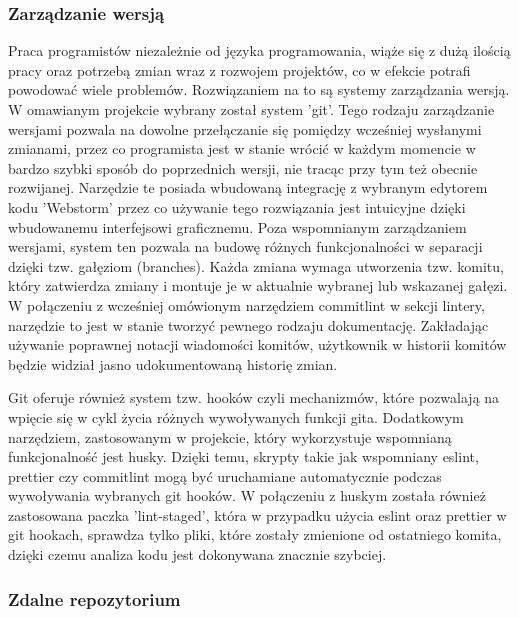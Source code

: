 \subsubsection{Zarządzanie wersją}

Praca programistów niezależnie od języka programowania, wiąże się z dużą ilością pracy oraz potrzebą zmian wraz z rozwojem projektów, co w efekcie potrafi powodować wiele problemów. Rozwiązaniem na to są systemy zarządzania wersją. W omawianym projekcie wybrany został system 'git'. Tego rodzaju zarządzanie wersjami pozwala na dowolne przełączanie się pomiędzy wcześniej wysłanymi zmianami, przez co programista jest w stanie wrócić w każdym momencie w bardzo szybki sposób do poprzednich wersji, nie tracąc przy tym też obecnie rozwijanej. Narzędzie te posiada wbudowaną integrację z wybranym edytorem kodu 'Webstorm' przez co używanie tego rozwiązania jest intuicyjne dzięki wbudowanemu interfejsowi graficznemu. Poza wspomnianym zarządzaniem wersjami, system ten pozwala na budowę różnych funkcjonalności w separacji dzięki tzw. gałęziom (branches). Każda zmiana wymaga utworzenia tzw. komitu, który zatwierdza zmiany i montuje je w aktualnie wybranej lub wskazanej gałęzi.
W połączeniu z wcześniej omówionym narzędziem commitlint w sekcji lintery, narzędzie to jest w stanie tworzyć pewnego rodzaju dokumentację. Zakładając używanie poprawnej notacji wiadomości komitów, użytkownik w historii komitów będzie widział jasno udokumentowaną historię zmian.

Git oferuje również system tzw. hooków czyli mechanizmów, które pozwalają na wpięcie się w cykl życia różnych wywoływanych funkcji gita.\cite{GitHooksDocs} Dodatkowym narzędziem, zastosowanym w projekcie, który wykorzystuje wspomnianą funkcjonalność jest husky. Dzięki temu, skrypty takie jak wspomniany eslint, prettier czy commitlint mogą być uruchamiane automatycznie podczas wywoływania wybranych git hooków. W połączeniu z huskym została również zastosowana paczka 'lint-staged', która w przypadku użycia eslint oraz prettier w git hookach, sprawdza tylko pliki, które zostały zmienione od ostatniego komita, dzięki czemu analiza kodu jest dokonywana znacznie szybciej.

\subsubsection{Zdalne repozytorium}


